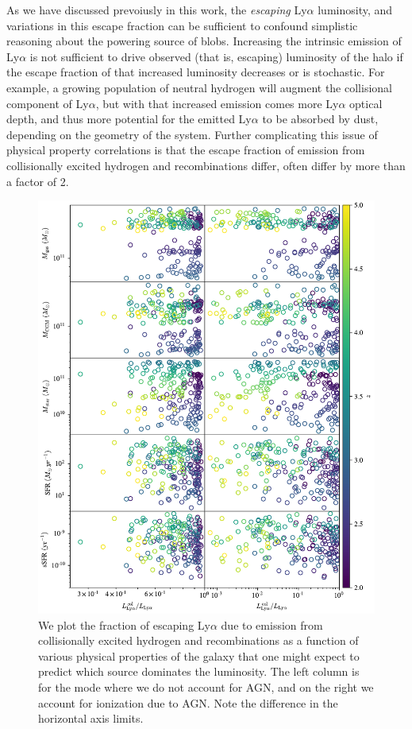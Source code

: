 As we have discussed prevoiusly in this work, the {\it escaping} Ly$\alpha$ luminosity, and variations in this escape fraction can be sufficient to confound simplistic reasoning about the powering source of blobs.
Increasing the intrinsic emission of Ly$\alpha$ is not sufficient to drive observed (that is, escaping) luminosity of the halo if the escape fraction of that increased luminosity decreases or is stochastic.
For example, a growing population of neutral hydrogen will augment the collisional component of Ly$\alpha$, but with that increased emission comes more Ly$\alpha$ optical depth, and thus more potential for the emitted Ly$\alpha$ to be absorbed by dust, depending on the geometry of the system.
Further complicating this issue of physical property correlations is that the escape fraction of emission from collisionally excited hydrogen and recombinations differ, often differ by more than a factor of 2.
\begin{figure}
    \centering
    \includegraphics[width=\textwidth,height=\textheight,keepaspectratio]{figures/appendix_correlations.pdf}
    \caption{
        We plot the fraction of escaping Ly$\alpha$ due to emission from collisionally excited hydrogen and recombinations as a function of various physical properties of the galaxy that one might expect to predict which source dominates the luminosity.
        The left column is for the mode where we do not account for AGN, and on the right we account for ionization due to AGN.
        Note the difference in the horizontal axis limits.
    }
    \label{fig:appendix_correlations}
\end{figure}
